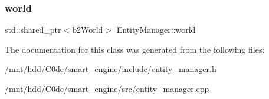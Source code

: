 \mbox{\label{classEntityManager_ad2fdb512c0f27c7c60fbc9e6d2da4995}} 
\subsubsection{\texorpdfstring{world}{world}}
{\footnotesize\ttfamily std\+::shared\+\_\+ptr$<$b2\+World$>$ Entity\+Manager\+::world\hspace{0.3cm}{\ttfamily [private]}}



The documentation for this class was generated from the following files\+:\begin{DoxyCompactItemize}
\item 
/mnt/hdd/\+C0de/smart\+\_\+engine/include/\hyperlink{entity__manager_8h}{entity\+\_\+manager.\+h}\item 
/mnt/hdd/\+C0de/smart\+\_\+engine/src/\hyperlink{entity__manager_8cpp}{entity\+\_\+manager.\+cpp}\end{DoxyCompactItemize}
